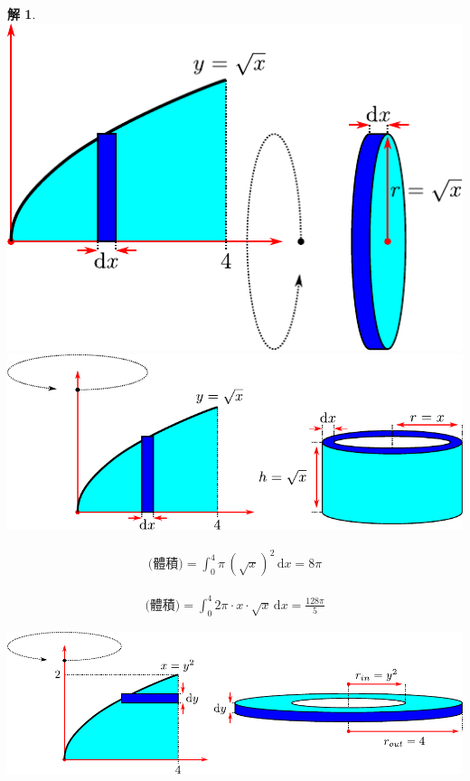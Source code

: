 \documentclass[12pt]{extarticle}
\theoremstyle{definition}
\newtheorem*{sol}{解}
\begin{document}
\begin{sol}
  \begin{minipage}{\textwidth}
    \hspace{5mm}
    \includegraphics[scale=.8]{rot_rootx1} 
    \includegraphics[scale=.8]{rot_rootx2} 
  \end{minipage}
  \begin{minipage}{.5\textwidth}
    \begin{align*}
      \text{(體積)} = \int_0^4\!\pi\,(\sqrt{x})^2\,\text{d}x = 8\pi
    \end{align*}
  \end{minipage}
  \begin{minipage}{.5\textwidth}
    \begin{align*}
      \text{(體積)} = \int_0^4\!2\pi\cdot x\cdot\sqrt{x}\,\text{d}x = \frac{128\pi}{5}
    \end{align*}
  \end{minipage}
  \begin{minipage}{.65\textwidth}
    \includegraphics[scale=.75]{rot_rootx3} 

\end{minipage}
\end{sol}
\end{document}

